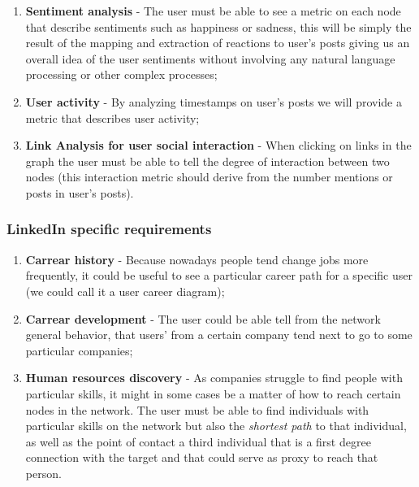 \begin{enumerate}
    \item \textbf{Sentiment analysis} - The user must be able to see a metric on each node that describe sentiments such as happiness or sadness, this will be simply the result of the mapping and extraction of reactions to user's posts giving us an overall idea of the user sentiments without involving any natural language processing or other complex processes;
    \item \textbf{User activity} - By analyzing timestamps on user's posts we will provide a metric that describes user activity;
    \item \textbf{Link Analysis for user social interaction} - When clicking on links in the graph the user must be able to tell the degree of interaction between two nodes (this interaction metric should derive from the number mentions or posts in user's posts).
\end{enumerate}

\subsubsection*{LinkedIn specific requirements}

\begin{enumerate}
    \item \textbf{Carrear history} - Because nowadays people tend change jobs more frequently, it could be useful to see a particular career path for a specific
    user (we could call it a user career diagram);
    \item \textbf{Carrear development} - The user could be able tell from the network general behavior, that users' from a certain company tend next to go to some particular companies;
    \item \textbf{Human resources discovery} - As companies struggle to find people with particular skills, it might in some cases be a matter of how to reach certain nodes in the network. The user must be able to find individuals with particular skills on the network but also the \textit{shortest path} to that individual, as well as the point of contact a third individual that is a first degree connection with the target and that could serve as proxy to reach that person.
\end{enumerate}
